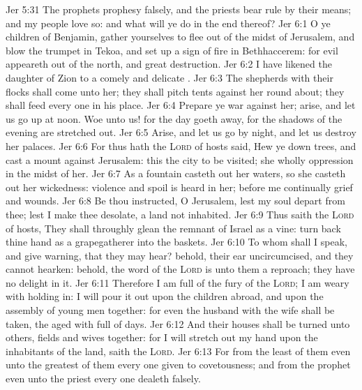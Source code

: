 \vs Jer 5:31 The prophets prophesy falsely, and the priests bear rule by their means; and my people love  so: and what will ye do in the end thereof?
\vs Jer 6:1 O ye children of Benjamin, gather yourselves to flee out of the midst of Jerusalem, and blow the trumpet in Tekoa, and set up a sign of fire in Bethhaccerem: for evil appeareth out of the north, and great destruction.
\vs Jer 6:2 I have likened the daughter of Zion to a comely and delicate .
\vs Jer 6:3 The shepherds with their flocks shall come unto her; they shall pitch  tents against her round about; they shall feed every one in his place.
\vs Jer 6:4 Prepare ye war against her; arise, and let us go up at noon. Woe unto us! for the day goeth away, for the shadows of the evening are stretched out.
\vs Jer 6:5 Arise, and let us go by night, and let us destroy her palaces.
\vs Jer 6:6 For thus hath the \textsc{Lord} of hosts said, Hew ye down trees, and cast a mount against Jerusalem: this  the city to be visited; she  wholly oppression in the midst of her.
\vs Jer 6:7 As a fountain casteth out her waters, so she casteth out her wickedness: violence and spoil is heard in her; before me continually  grief and wounds.
\vs Jer 6:8 Be thou instructed, O Jerusalem, lest my soul depart from thee; lest I make thee desolate, a land not inhabited.
\vs Jer 6:9 Thus saith the \textsc{Lord} of hosts, They shall throughly glean the remnant of Israel as a vine: turn back thine hand as a grapegatherer into the baskets.
\vs Jer 6:10 To whom shall I speak, and give warning, that they may hear? behold, their ear  uncircumcised, and they cannot hearken: behold, the word of the \textsc{Lord} is unto them a reproach; they have no delight in it.
\vs Jer 6:11 Therefore I am full of the fury of the \textsc{Lord}; I am weary with holding in: I will pour it out upon the children abroad, and upon the assembly of young men together: for even the husband with the wife shall be taken, the aged with  full of days.
\vs Jer 6:12 And their houses shall be turned unto others,  fields and wives together: for I will stretch out my hand upon the inhabitants of the land, saith the \textsc{Lord}.
\vs Jer 6:13 For from the least of them even unto the greatest of them every one  given to covetousness; and from the prophet even unto the priest every one dealeth falsely.
